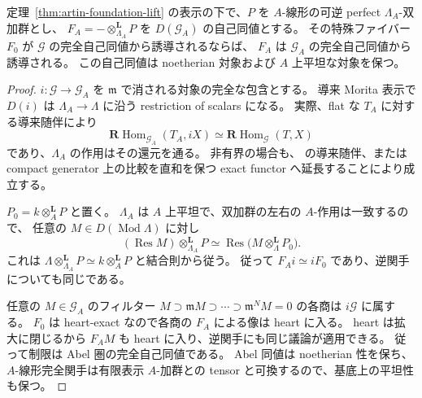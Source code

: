 \begin{lemma}
\label{lem:artin-morita-heart-exact}
定理~\ref{thm:artin-foundation-lift} の表示の下で、$P$ を
$A$-線形の可逆 perfect $\Lambda_A$-双加群とし、
$F_A=-\otimes_{\Lambda_A}^{\mathbf L}P$ を $D(\mathcal G_A)$ の自己同値とする。
その特殊ファイバー $F_0$ が $\mathcal G$ の完全自己同値から誘導されるならば、
$F_A$ は $\mathcal G_A$ の完全自己同値から誘導される。
この自己同値は noetherian 対象および $A$ 上平坦な対象を保つ。
\end{lemma}
\begin{proof}
$i:\mathcal G\to\mathcal G_A$ を $\mathfrak m$ で消される対象の完全な包含とする。
導来 Morita 表示で $D(i)$ は $\Lambda_A\to\Lambda$ に沿う restriction of scalars になる。
実際、flat な $T_A$ に対する導来随伴により
\[
 \mathbf R\operatorname{Hom}_{\mathcal G_A}(T_A,iX)
 \simeq \mathbf R\operatorname{Hom}_{\mathcal G}(T,X)
\]
であり、$\Lambda_A$ の作用はその還元を通る。
非有界の場合も、\cite[\S5.2]{DeDekenLowen2011} の導来随伴、または
compact generator 上の比較を直和を保つ exact functor へ延長することにより成立する。

$P_0=k\otimes_A^{\mathbf L}P$ と置く。
$\Lambda_A$ は $A$ 上平坦で、双加群の左右の $A$-作用は一致するので、
任意の $M\in D(\operatorname{Mod}\Lambda)$ に対し
\[
 (\operatorname{Res}M)\otimes_{\Lambda_A}^{\mathbf L}P
 \simeq
 \operatorname{Res}\bigl(M\otimes_\Lambda^{\mathbf L}P_0\bigr).
\]
これは $\Lambda\otimes_{\Lambda_A}^{\mathbf L}P
\simeq k\otimes_A^{\mathbf L}P$ と結合則から従う。
従って $F_A i\simeq iF_0$ であり、逆関手についても同じである。

任意の $M\in\mathcal G_A$ のフィルター
$M\supset\mathfrak mM\supset\cdots\supset\mathfrak m^NM=0$
の各商は $i\mathcal G$ に属する。
$F_0$ は heart-exact なので各商の $F_A$ による像は heart に入る。
heart は拡大に閉じるから $F_A M$ も heart に入り、逆関手にも同じ議論が適用できる。
従って制限は Abel 圏の完全自己同値である。
Abel 同値は noetherian 性を保ち、$A$-線形完全関手は有限表示 $A$-加群との
tensor と可換するので、基底上の平坦性も保つ。
\end{proof}

